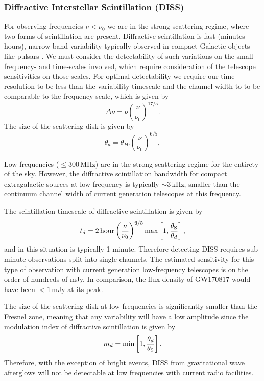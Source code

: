 \subsubsection{Diffractive Interstellar Scintillation (DISS)}
\label{subsec:diss_description}
For observing frequencies $\nu < \nu_0$ we are in the strong scattering regime, where two forms of scintillation are present. Diffractive scintillation is fast (minutes--hours), narrow-band variability typically observed in compact Galactic objects like pulsars \citep[e.g.][]{1977ARA&A..15..479R,1986ApJ...311..183C,1992Natur.360..137P,1997NewA....2..449G,2016MNRAS.461..908B}. We must consider the detectability of such variations on the small frequency- and time-scales involved, which require consideration of the telescope sensitivities on those scales. For optimal detectability we require our time resolution to be less than the variability timescale and the channel width to to be comparable to the frequency scale, which  is given by
\begin{equation}
\Delta\nu = \nu \left(\frac{\nu}{\nu_0}\right)^{17/5}.
\label{eq:diffractive_freq_scale}
\end{equation}
The size of the scattering disk is given by
\begin{equation}
\theta_{d} = \theta_{F0} \left(\frac{\nu}{\nu_0} \right)^{6/5},
\label{eq:scattering_disk_diffractive}
\end{equation}

Low frequencies ($\leq 300$\,MHz) are in the strong scattering regime for the entirety of the sky. However, the diffractive scintillation bandwidth for compact extragalactic sources at low frequency is typically $\sim 3\,$kHz, smaller than the continuum channel width of current generation telescopes at this frequency. 

The scintillation timescale of diffractive scintillation is given by
\begin{equation}
t_d = 2\,{\rm hour}\left(\frac{\nu}{\nu_0} \right)^{6/5} \max\left[1,\frac{\theta_{\rm S}}{\theta_{d}} \right],
\label{eq:timescale_diffractive}
\end{equation}
and in this situation is typically 1 minute. Therefore detecting DISS requires sub-minute observations split into single channels. The estimated sensitivity for this type of observation with current generation low-frequency telescopes is on the order of hundreds of mJy. In comparison, the flux density of GW170817 would have been $<1\,$mJy at its peak.

The size of the scattering disk at low frequencies is significantly smaller than the Fresnel zone, meaning that any variability will have a low amplitude since the modulation index of diffractive scintillation is given by
\begin{equation}
m_d = \min\left[1, \frac{\theta_d}{\theta_{\rm S}}\right].
\label{eq:mod_index_diffractive}
\end{equation}
Therefore, with the exception of bright events, DISS from gravitational wave afterglows will not be detectable at low frequencies with current radio facilities.

